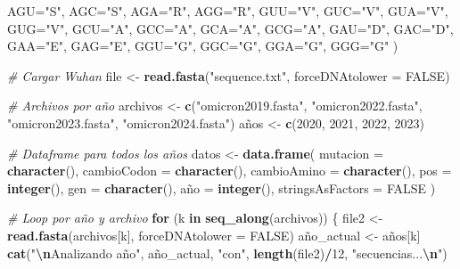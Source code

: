 \documentclass[
]{article}
\newenvironment{Shaded}{\begin{snugshade}}{\end{snugshade}}
\newcommand{\AttributeTok}[1]{\textcolor[rgb]{0.13,0.29,0.53}{#1}}
\newcommand{\CommentTok}[1]{\textcolor[rgb]{0.56,0.35,0.01}{\textit{#1}}}
\newcommand{\ConstantTok}[1]{\textcolor[rgb]{0.56,0.35,0.01}{#1}}
\newcommand{\ControlFlowTok}[1]{\textcolor[rgb]{0.13,0.29,0.53}{\textbf{#1}}}
\newcommand{\DecValTok}[1]{\textcolor[rgb]{0.00,0.00,0.81}{#1}}
\newcommand{\FunctionTok}[1]{\textcolor[rgb]{0.13,0.29,0.53}{\textbf{#1}}}
\newcommand{\NormalTok}[1]{#1}
\newcommand{\OtherTok}[1]{\textcolor[rgb]{0.56,0.35,0.01}{#1}}
\newcommand{\SpecialCharTok}[1]{\textcolor[rgb]{0.81,0.36,0.00}{\textbf{#1}}}
\newcommand{\StringTok}[1]{\textcolor[rgb]{0.31,0.60,0.02}{#1}}
\begin{document}
\begin{Shaded}
\begin{Highlighting}[]
  \AttributeTok{AGU=}\StringTok{"S"}\NormalTok{, }\AttributeTok{AGC=}\StringTok{"S"}\NormalTok{, }\AttributeTok{AGA=}\StringTok{"R"}\NormalTok{, }\AttributeTok{AGG=}\StringTok{"R"}\NormalTok{,}
  \AttributeTok{GUU=}\StringTok{"V"}\NormalTok{, }\AttributeTok{GUC=}\StringTok{"V"}\NormalTok{, }\AttributeTok{GUA=}\StringTok{"V"}\NormalTok{, }\AttributeTok{GUG=}\StringTok{"V"}\NormalTok{,}
  \AttributeTok{GCU=}\StringTok{"A"}\NormalTok{, }\AttributeTok{GCC=}\StringTok{"A"}\NormalTok{, }\AttributeTok{GCA=}\StringTok{"A"}\NormalTok{, }\AttributeTok{GCG=}\StringTok{"A"}\NormalTok{,}
  \AttributeTok{GAU=}\StringTok{"D"}\NormalTok{, }\AttributeTok{GAC=}\StringTok{"D"}\NormalTok{, }\AttributeTok{GAA=}\StringTok{"E"}\NormalTok{, }\AttributeTok{GAG=}\StringTok{"E"}\NormalTok{,}
  \AttributeTok{GGU=}\StringTok{"G"}\NormalTok{, }\AttributeTok{GGC=}\StringTok{"G"}\NormalTok{, }\AttributeTok{GGA=}\StringTok{"G"}\NormalTok{, }\AttributeTok{GGG=}\StringTok{"G"}
\NormalTok{)}

\CommentTok{\# Cargar Wuhan}
\NormalTok{file }\OtherTok{\textless{}{-}} \FunctionTok{read.fasta}\NormalTok{(}\StringTok{"sequence.txt"}\NormalTok{, }\AttributeTok{forceDNAtolower =} \ConstantTok{FALSE}\NormalTok{)}

\CommentTok{\# Archivos por año}
\NormalTok{archivos }\OtherTok{\textless{}{-}} \FunctionTok{c}\NormalTok{(}\StringTok{"omicron2019.fasta"}\NormalTok{, }\StringTok{"omicron2022.fasta"}\NormalTok{, }\StringTok{"omicron2023.fasta"}\NormalTok{, }\StringTok{"omicron2024.fasta"}\NormalTok{)}
\NormalTok{años }\OtherTok{\textless{}{-}} \FunctionTok{c}\NormalTok{(}\DecValTok{2020}\NormalTok{, }\DecValTok{2021}\NormalTok{, }\DecValTok{2022}\NormalTok{, }\DecValTok{2023}\NormalTok{)}

\CommentTok{\# Dataframe para todos los años}
\NormalTok{datos }\OtherTok{\textless{}{-}} \FunctionTok{data.frame}\NormalTok{(}
  \AttributeTok{mutacion =} \FunctionTok{character}\NormalTok{(),}
  \AttributeTok{cambioCodon =} \FunctionTok{character}\NormalTok{(),}
  \AttributeTok{cambioAmino =} \FunctionTok{character}\NormalTok{(),}
  \AttributeTok{pos =} \FunctionTok{integer}\NormalTok{(),}
  \AttributeTok{gen =} \FunctionTok{character}\NormalTok{(),}
\NormalTok{  año }\OtherTok{=} \FunctionTok{integer}\NormalTok{(),}
  \AttributeTok{stringsAsFactors =} \ConstantTok{FALSE}
\NormalTok{)}

\CommentTok{\# Loop por año y archivo}
\ControlFlowTok{for}\NormalTok{ (k }\ControlFlowTok{in} \FunctionTok{seq\_along}\NormalTok{(archivos)) \{}
\NormalTok{  file2 }\OtherTok{\textless{}{-}} \FunctionTok{read.fasta}\NormalTok{(archivos[k], }\AttributeTok{forceDNAtolower =} \ConstantTok{FALSE}\NormalTok{)}
\NormalTok{  año\_actual }\OtherTok{\textless{}{-}}\NormalTok{ años[k]}
  \FunctionTok{cat}\NormalTok{(}\StringTok{"}\SpecialCharTok{\textbackslash{}n}\StringTok{Analizando año"}\NormalTok{, año\_actual, }\StringTok{"con"}\NormalTok{, }\FunctionTok{length}\NormalTok{(file2)}\SpecialCharTok{/}\DecValTok{12}\NormalTok{, }\StringTok{"secuencias...}\SpecialCharTok{\textbackslash{}n}\StringTok{"}\NormalTok{)}
  

\end{Highlighting}
\end{Shaded}
\end{document}
